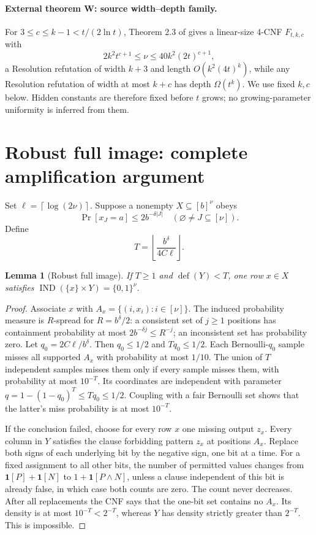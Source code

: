 \documentclass[11pt]{article}
\newtheorem{lemma}[theorem]{Lemma}
\newcommand{\IND}{\operatorname{IND}}
\newcommand{\ceil}[1]{\left\lceil #1\right\rceil}
\newcommand{\floor}[1]{\left\lfloor #1\right\rfloor}
\begin{document}
\paragraph{External theorem W: source width--depth family.}
For $3\le c\le k-1<t/(2\ln t)$, Theorem 2.3 of \cite{tradeoff} gives a
linear-size 4-CNF $F_{t,k,c}$ with
\[
 2k^2t^{c+1}\le\nu\le40k^2(2t)^{c+1},                    \tag{3}
\]
a Resolution refutation of width $k+3$ and length $O(k^2(4t)^k)$, while any
Resolution refutation of width at most $k+c$ has depth $\Omega(t^k)$.
We use fixed $k,c$ below. Hidden constants are therefore fixed before $t$
grows; no growing-parameter uniformity is inferred from them.

\section{Robust full image: complete amplification argument}
Set $\ell=\ceil{\log(2\nu)}$. Suppose a nonempty $X\subseteq[b]^\nu$ obeys
\[
 \Pr[x_J=a]\le2b^{-\delta|J|}
 \quad(\varnothing\ne J\subseteq[\nu]).                  \tag{4}
\]
Define
\[
             T=\floor{\frac{b^\delta}{4C\ell}}.
\]
\begin{lemma}[Robust full image]\label{lem:image}
If $T\ge1$ and $\operatorname{def}(Y)<T$, one row $x\in X$ satisfies
$\IND(\{x\}\times Y)=\{0,1\}^\nu$.
\end{lemma}
\begin{proof}
Associate $x$ with $A_x=\{(i,x_i):i\in[\nu]\}$. The induced probability
measure is $R$-spread for $R=b^\delta/2$: a consistent set of $j\ge1$
positions has containment probability at most $2b^{-\delta j}\le R^{-j}$;
an inconsistent set has probability zero. Let $q_0=2C\ell/b^\delta$.
Then $q_0\le1/2$ and $Tq_0\le1/2$. Each Bernoulli-$q_0$ sample misses all
supported $A_x$ with probability at most $1/10$. The union of $T$
independent samples misses them only if every sample misses them, with
probability at most $10^{-T}$. Its coordinates are independent with
parameter $q=1-(1-q_0)^T\le Tq_0\le1/2$. Coupling with a fair Bernoulli set
shows that the latter's miss probability is at most $10^{-T}$.

If the conclusion failed, choose for every row $x$ one missing output
$z_x$. Every column in $Y$ satisfies the clause forbidding pattern $z_x$
at positions $A_x$. Replace both signs of each underlying bit by the
negative sign, one bit at a time. For a fixed assignment to all other bits,
the number of permitted values changes from
$\mathbf1[P]+\mathbf1[N]$ to $1+\mathbf1[P\wedge N]$, unless a clause
independent of this bit is already false, in which case both counts are
zero. The count never decreases. After all replacements the CNF says
that the one-bit set contains no $A_x$. Its density is at most
$10^{-T}<2^{-T}$, whereas $Y$ has density strictly greater than $2^{-T}$.
This is impossible.
\end{proof}
\end{document}
